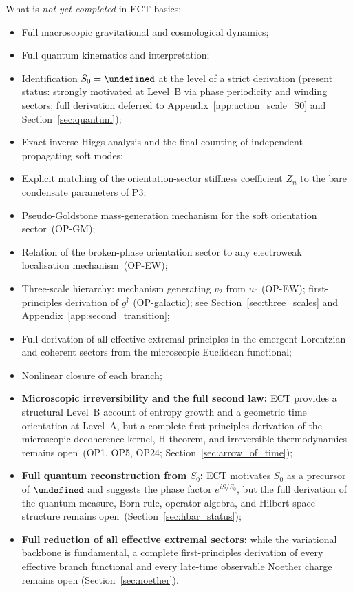 \documentclass[11pt,a4paper]{article}
\let\hbar\undefined
\numberwithin{equation}{section}
\begin{document}
What is \emph{not yet completed} in ECT basics:
\begin{itemize}
  \item Full macroscopic gravitational and cosmological dynamics;
  \item Full quantum kinematics and interpretation;
  \item Identification $S_0=\hbar$ at the level of a strict derivation
    (present status: strongly motivated at Level~B via phase periodicity
    and winding sectors; full derivation deferred to
    Appendix~\ref{app:action_scale_S0} and Section~\ref{sec:quantum});
  \item Exact inverse-Higgs analysis and the final counting of
    independent propagating soft modes;
  \item Explicit matching of the orientation-sector stiffness
    coefficient $Z_n$ to the bare condensate parameters of P3;
  \item Pseudo-Goldstone mass-generation mechanism for the soft
    orientation sector~(OP-GM);
  \item Relation of the broken-phase orientation sector to any
    electroweak localisation mechanism~(OP-EW);
  \item Three-scale hierarchy: mechanism generating $v_2$ from $u_0$
    (OP-EW); first-principles derivation of $g^\dagger$ (OP-galactic);
    see Section~\ref{sec:three_scales} and Appendix~\ref{app:second_transition};
  \item Full derivation of all effective extremal principles in the
    emergent Lorentzian and coherent sectors from the microscopic
    Euclidean functional;
  \item Nonlinear closure of each branch;
  \item \textbf{Microscopic irreversibility and the full second law:}
    ECT provides a structural Level~B account of entropy growth
    and a geometric time orientation at Level~A, but a complete
    first-principles derivation of the microscopic decoherence
    kernel, H-theorem, and irreversible thermodynamics remains
    open~(OP1, OP5, OP24; Section~\ref{sec:arrow_of_time});
  \item \textbf{Full quantum reconstruction from $S_0$:}
    ECT motivates $S_0$ as a precursor of $\hbar$ and suggests
    the phase factor $e^{iS/S_0}$, but the full derivation of the
    quantum measure, Born rule, operator algebra, and Hilbert-space
    structure remains open~(Section~\ref{sec:hbar_status});
  \item \textbf{Full reduction of all effective extremal sectors:}
    while the variational backbone is fundamental, a complete
    first-principles derivation of every effective branch functional
    and every late-time observable Noether charge remains open
    (Section~\ref{sec:noether}).
\end{itemize}
\end{document}
